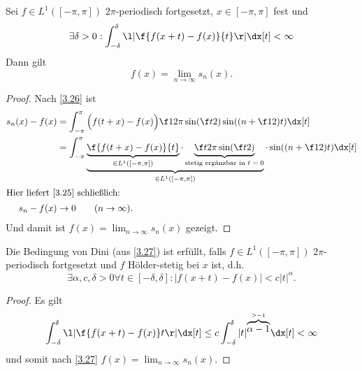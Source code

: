 \begin{st} \label{3.27}
	Sei $f \in L^1([-\pi,\pi])$ $2\pi$-periodisch fortgesetzt, $x \in [-\pi,\pi]$ fest und
	\[
		\exists \delta > 0 : \int_{-\delta}^{\delta} \l| \f{f(x+t)-f(x)}{t} \r| \dx[t] < \infty
	\]
	Dann gilt 
	\[
		f(x) = \lim_{n\to\infty} s_n(x).
	\]
	\begin{proof}
		Nach \ref{3.26} ist
		\begin{align*}
			s_n(x)-f(x)
			&= \int_{-\pi}^\pi \Big( f(t+x)-f(x) \Big) \f 1{2\pi \sin(\f t2)} \sin((n+\f 12) t) \dx[t] \\
			&= \int_{-\pi}^\pi \underbrace{\underbrace{\f {f(t+x)-f(x)}{t}}_{\in L^1([-\pi,\pi])} \cdot 
		\underbrace{\f t{2\pi \sin(\f t2)}}_{\text{stetig ergänzbar in $t=0$}}}_{\in L^1([-\pi,\pi])} \cdot \sin((n+\f 12) t) \dx[t] \\
			\intertext{Hier liefert \ref{3.25} schließlich:}
			s_n-f(x)&\to 0 \qquad (n\to \infty).
		\end{align*}
		Und damit ist $f(x)=\lim_{n\to \infty} s_n(x)$ gezeigt.
	\end{proof}
\end{st}

\begin{nt} \label{3.28}
	Die Bedingung von Dini (aus \ref{3.27}) ist erfüllt, falls $f \in L^1([-\pi,\pi])$ $2\pi$-periodisch fortgesetzt und $f$ Hölder-stetig bei $x$ ist, d.h.
	\[
		\exists \alpha, c, \delta > 0 \forall t \in [-\delta, \delta] : |f(x+t) - f(x)| < c |t|^\alpha.
	\]
	\begin{proof}
		Es gilt
		\[
			\int_{-\delta}^{\delta} \l| \f{f(x+t) - f(x)}t \r| \dx[t] 
			\le c \int_{-\delta}^\delta |t|^{\overbrace{\alpha - 1}^{>-1}} \dx[t]
			< \infty
		\]
		und somit nach \ref{3.27} $f(x) = \lim_{n\to\infty} s_n(x)$.
	\end{proof}
\end{nt}

